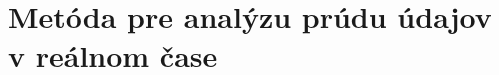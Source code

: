\chapter{Metóda pre analýzu prúdu údajov v reálnom čase}
\label{Method for data stream analysis in real-time} 
